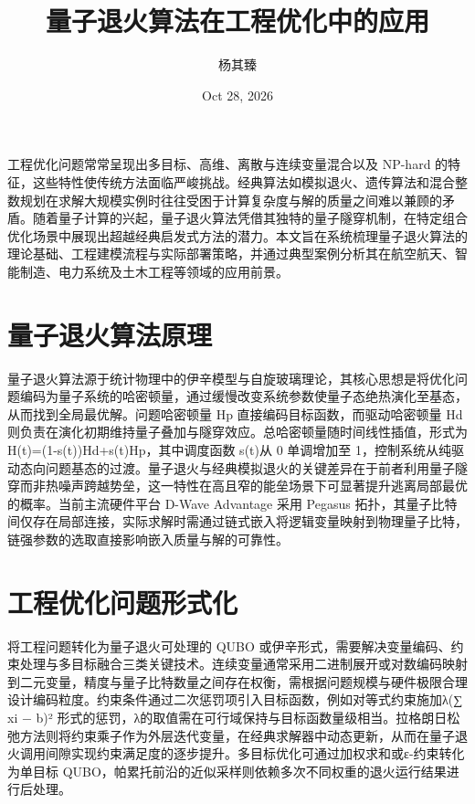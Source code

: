 \title{量子退火算法在工程优化中的应用}
\author{杨其臻}
\date{Oct 28, 2026}
\maketitle
工程优化问题常常呈现出多目标、高维、离散与连续变量混合以及 NP-hard 的特征，这些特性使传统方法面临严峻挑战。经典算法如模拟退火、遗传算法和混合整数规划在求解大规模实例时往往受困于计算复杂度与解的质量之间难以兼顾的矛盾。随着量子计算的兴起，量子退火算法凭借其独特的量子隧穿机制，在特定组合优化场景中展现出超越经典启发式方法的潜力。本文旨在系统梳理量子退火算法的理论基础、工程建模流程与实际部署策略，并通过典型案例分析其在航空航天、智能制造、电力系统及土木工程等领域的应用前景。\par
\chapter{量子退火算法原理}
量子退火算法源于统计物理中的伊辛模型与自旋玻璃理论，其核心思想是将优化问题编码为量子系统的哈密顿量，通过缓慢改变系统参数使量子态绝热演化至基态，从而找到全局最优解。问题哈密顿量 Hp 直接编码目标函数，而驱动哈密顿量 Hd 则负责在演化初期维持量子叠加与隧穿效应。总哈密顿量随时间线性插值，形式为 H(t)=(1-s(t))Hd+s(t)Hp，其中调度函数 s(t)从 0 单调增加至 1，控制系统从纯驱动态向问题基态的过渡。量子退火与经典模拟退火的关键差异在于前者利用量子隧穿而非热噪声跨越势垒，这一特性在高且窄的能垒场景下可显著提升逃离局部最优的概率。当前主流硬件平台 D-Wave Advantage 采用 Pegasus 拓扑，其量子比特间仅存在局部连接，实际求解时需通过链式嵌入将逻辑变量映射到物理量子比特，链强参数的选取直接影响嵌入质量与解的可靠性。\par
\chapter{工程优化问题形式化}
将工程问题转化为量子退火可处理的 QUBO 或伊辛形式，需要解决变量编码、约束处理与多目标融合三类关键技术。连续变量通常采用二进制展开或对数编码映射到二元变量，精度与量子比特数量之间存在权衡，需根据问题规模与硬件极限合理设计编码粒度。约束条件通过二次惩罚项引入目标函数，例如对等式约束施加λ(∑ xi − b)² 形式的惩罚，λ的取值需在可行域保持与目标函数量级相当。拉格朗日松弛方法则将约束乘子作为外层迭代变量，在经典求解器中动态更新，从而在量子退火调用间隙实现约束满足度的逐步提升。多目标优化可通过加权求和或ε-约束转化为单目标 QUBO，帕累托前沿的近似采样则依赖多次不同权重的退火运行结果进行后处理。\par
